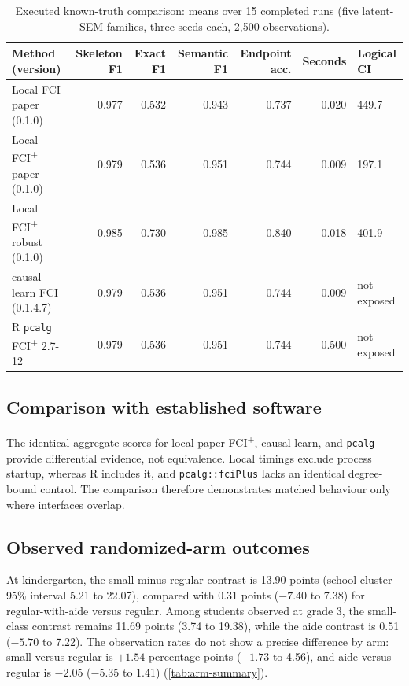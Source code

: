 \documentclass[11pt,a4paper]{article}
\theoremstyle{definition}
\newcommand{\FCIplus}{FCI\textsuperscript{+}}
\newcommand{\code}[1]{\texttt{#1}}
\begin{document}
\begin{table}[!t]
\caption{Executed known-truth comparison: means over 15 completed runs
(five latent-SEM families, three seeds each, 2,500 observations).}
\label{tab:executed-software-benchmark}
\centering
\begin{tabularx}{\textwidth}{p{}rrrrrY}
\toprule
Method (version) & Skeleton F1 & Exact F1 & Semantic F1 &
Endpoint acc. & Seconds & Logical CI \\
\midrule
Local FCI paper (0.1.0) & 0.977 & 0.532 & 0.943 & 0.737 & 0.020 & 449.7 \\
Local \FCIplus{} paper (0.1.0) & 0.979 & 0.536 & 0.951 & 0.744 & 0.009 & 197.1 \\
Local \FCIplus{} robust (0.1.0) & 0.985 & 0.730 & 0.985 & 0.840 & 0.018 & 401.9 \\
causal-learn FCI (0.1.4.7) & 0.979 & 0.536 & 0.951 & 0.744 & 0.009 & not exposed \\
R \code{pcalg} \FCIplus{} \mbox{2.7-12} & 0.979 & 0.536 & 0.951 & 0.744 & 0.500 & not exposed \\
\bottomrule
\end{tabularx}
\end{table}

\subsection{Comparison with established software}

The identical aggregate scores for local paper-\FCIplus{}, causal-learn, and
\code{pcalg} provide differential evidence, not equivalence. Local timings
exclude process startup, whereas R includes it, and
\code{pcalg::fciPlus} lacks an identical degree-bound control. The comparison
therefore demonstrates matched behaviour only where interfaces overlap.

\subsection{Observed randomized-arm outcomes}

At kindergarten, the small-minus-regular contrast is 13.90 points
(school-cluster 95\% interval 5.21 to 22.07), compared with 0.31 points
(\(-7.40\) to 7.38) for regular-with-aide versus regular. Among students
observed at grade 3, the small-class contrast remains 11.69 points (3.74 to
19.38), while the aide contrast is 0.51 (\(-5.70\) to 7.22). The observation
rates do not show a precise difference by arm: small versus regular is
\(+1.54\) percentage points (\(-1.73\) to 4.56), and aide versus regular is
\(-2.05\) (\(-5.35\) to 1.41) (\cref{tab:arm-summary}).
\end{document}
